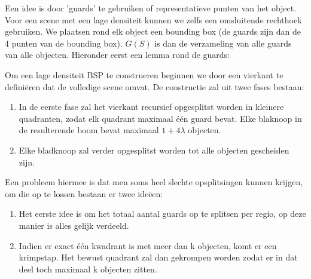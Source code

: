 \documentclass[12pt,a4paper]{article}
\begin{document}
	Een idee is door 'guards' te gebruiken of representatieve punten van het object. Voor een scene met een lage densiteit kunnen we zelfs een omsluitende rechthoek gebruiken. We plaatsen rond elk object een bounding box (de guards zijn dan de 4 punten van de bounding box). $G(S)$ is dan de verzameling van alle guards van alle objecten. Hieronder eerst een lemma rond de guards: 
	\begin{figure}[H]
		\centering
		\label{fig:BSP-lemmalol}
	\end{figure}
	Om een lage densiteit BSP te construeren beginnen we door een vierkant te definiëren dat de volledige scene omvat. De constructie zal uit twee fases bestaan: 
	\begin{enumerate}
		\item In de eerste fase zal het vierkant recursief opgesplitst worden in kleinere quadranten, zodat elk quadrant maximaal één guard bevat. Elke blaknoop in de resulterende boom bevat maximaal $1+4\lambda$ objecten. 
		\item Elke bladknoop zal verder opgesplitst worden tot alle objecten gescheiden zijn. 
	\end{enumerate}
	Een probleem hiermee is dat men soms heel slechte opsplitsingen kunnen krijgen, om die op te lossen bestaan er twee ideëen: 
	\begin{enumerate}
		\item Het eerste idee is om het totaal aantal guards op te splitsen per regio, op deze manier is alles gelijk verdeeld.
		\item Indien er exact één kwadrant is met meer dan k objecten, komt er een krimpstap. Het bewust quadrant zal dan gekrompen worden zodat er in dat deel toch maximaal k objecten zitten. 
	\end{enumerate}
\end{document}
